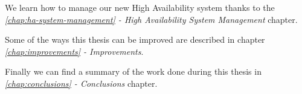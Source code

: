 We learn how to manage our new High Availability system thanks to the \textit{\ref{chap:ha-system-management} - High Availability System Management} chapter.

Some of the ways this thesis can be improved are described in chapter \textit{\ref{chap:improvements} - Improvements}.

Finally we can find a summary of the work done during this thesis in \textit{\ref{chap:conclusions} - Conclusions} chapter.

